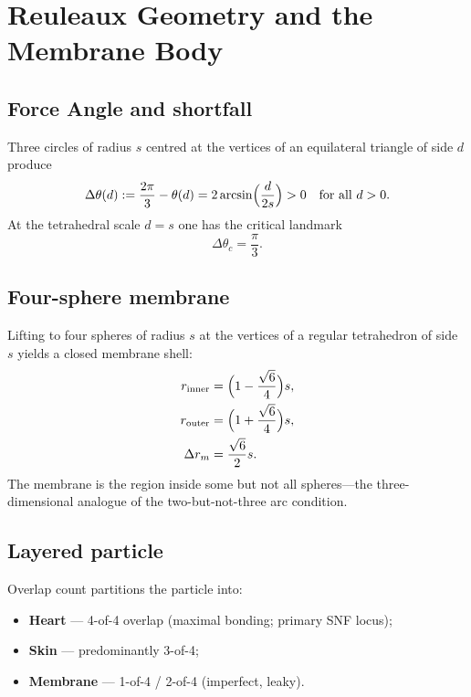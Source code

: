 \section{Reuleaux Geometry and the Membrane Body}
\label{sec:geometry}

\subsection{Force Angle and shortfall}
Three circles of radius $s$ centred at the vertices of an equilateral triangle of
side $d$ produce
\[
\Delta\theta(d):=\frac{2\pi}{3}-\theta(d)=2\arcsin\Bigl(\frac{d}{2s}\Bigr)>0
\quad\text{for all }d>0.
\]
At the tetrahedral scale $d=s$ one has the critical landmark
\[
\Delta\theta_c=\frac{\pi}{3}.
\]

\subsection{Four-sphere membrane}
Lifting to four spheres of radius $s$ at the vertices of a regular tetrahedron of
side $s$ yields a closed membrane shell:
\begin{align*}
r_{\mathrm{inner}}&=\Bigl(1-\frac{\sqrt{6}}{4}\Bigr)s,\\
r_{\mathrm{outer}}&=\Bigl(1+\frac{\sqrt{6}}{4}\Bigr)s,\\
\Delta r_m&=\frac{\sqrt{6}}{2}s.
\end{align*}
The membrane is the region inside some but not all spheres---the three-dimensional
analogue of the two-but-not-three arc condition.

\subsection{Layered particle}
Overlap count partitions the particle into:
\begin{itemize}
\item \textbf{Heart} --- 4-of-4 overlap (maximal bonding; primary SNF locus);
\item \textbf{Skin} --- predominantly 3-of-4;
\item \textbf{Membrane} --- 1-of-4 / 2-of-4 (imperfect, leaky).
\end{itemize}
